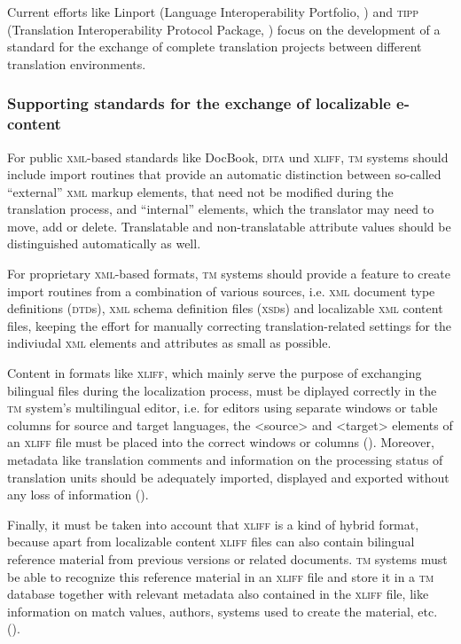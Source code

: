 \documentclass[output=paper]{LSP/langsci}
\begin{document}
Current efforts like Linport (Language Interoperability Portfolio, \citealt{Linport2012}) and \textsc{tipp} (Translation Interoperability Protocol Package, \citealt{InteroperabilityNow!2012}) focus on the development of a standard for the exchange of complete translation projects between different translation environments.

\subsubsection{Supporting standards for the exchange of localizable e-content}\label{sec:reinke:2.5.2}
 
For public \textsc{xml}-based standards like DocBook, \textsc{dita} und \textsc{xliff}, \textsc{tm} systems should include import routines that provide an automatic distinction between so-called ``external'' \textsc{xml} markup elements, that need not be modified during the translation process, and ``internal'' elements, which the translator may need to move, add or delete. Translatable and non-translatable attribute values should be distinguished automatically as well.
 
For proprietary \textsc{xml}-based formats, \textsc{tm} systems should provide a feature to create import routines from a combination of various sources, i.e. \textsc{xml} document type definitions (\textsc{dtd}s), \textsc{xml} schema definition files (\textsc{xsd}s) and localizable \textsc{xml} content files, keeping the effort for manually correcting translation-related settings for the indiviudal \textsc{xml} elements and attributes as small as possible.
 
Content in formats like \textsc{xliff}, which mainly serve the purpose of exchanging bilingual files during the localization process, must be diplayed correctly in the \textsc{tm} system's multilingual editor, i.e. for editors using separate windows or table columns for source and target languages, the {\textless}source{\textgreater} and {\textless}target{\textgreater} elements of an \textsc{xliff} file must be placed into the correct windows or columns (). Moreover, metadata like translation comments and information on the processing status of translation units should be adequately imported, displayed and exported without any loss of information ().
 
Finally, it must be taken into account that \textsc{xliff} is a kind of hybrid format, because apart from localizable content \textsc{xliff} files can also contain bilingual reference material from previous versions or related documents. \textsc{tm} systems must be able to recognize this reference material in an \textsc{xliff} file and store it in a \textsc{tm} database together with relevant metadata also contained in the \textsc{xliff} file, like information on match values, authors, systems used to create the material, etc. ().
\end{document}
